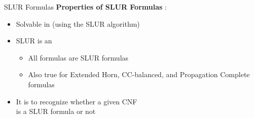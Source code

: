 \documentclass[t]{sdqbeamer}
\begin{document}
\begin{frame}{SLUR Formulas}
	\textbf{Properties of SLUR Formulas} \cite{vcepek2012properties}:
	\begin{itemize}
		\item Solvable in  (using the SLUR algorithm)
		\item SLUR is an 
		\begin{itemize}
			\item All  formulas are SLUR formulas
			\item Also true for Extended Horn, CC-balanced, and Propagation Complete formulas
		\end{itemize}
		\pause
		\item It is  to recognize whether a given CNF\\
		is a SLUR formula or not
	\end{itemize}
\end{frame}
\end{document}
